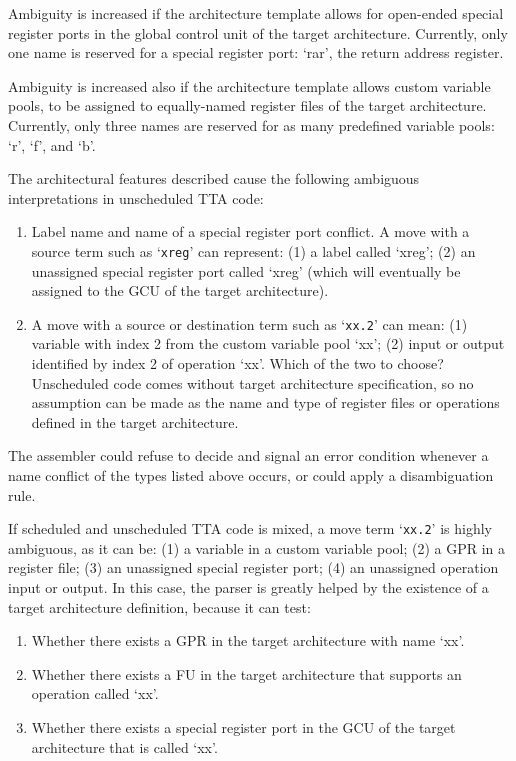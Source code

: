 \documentclass[twoside]{tce}
\begin{document}
Ambiguity is increased if the architecture template allows for open-ended
special register ports in the global control unit of the target
architecture. Currently, only one name is reserved for a special register
port: `rar', the return address register.

Ambiguity is increased also if the architecture template allows custom
variable pools, to be assigned to equally-named register files of the target
architecture. Currently, only three names are reserved for as many
predefined variable pools: `r', `f', and `b'.

The architectural features described cause the following ambiguous
interpretations in unscheduled TTA code:
\begin{enumerate}
\item %
  Label name and name of a special register port conflict. A move with a
  source term such as `\verb|xreg|' can represent: (1) a label called
  `xreg'; (2) an unassigned special register port called `xreg' (which will
  eventually be assigned to the GCU of the target architecture).
\item %
  A move with a source or destination term such as `\verb|xx.2|' can mean:
  (1) variable with index 2 from the custom variable pool `xx'; (2) input or
  output identified by index 2 of operation `xx'. Which of the two to
  choose? Unscheduled code comes without target architecture specification,
  so no assumption can be made as the name and type of register files or
  operations defined in the target architecture.
\end{enumerate}

The assembler could refuse to decide and signal an error condition whenever
a name conflict of the types listed above occurs, or could apply a
disambiguation rule.

If scheduled and unscheduled TTA code is mixed, a move term `\verb|xx.2|' is
highly ambiguous, as it can be: (1) a variable in a custom variable pool; (2)
a GPR in a register file; (3) an unassigned special register port; (4) an
unassigned operation input or output.
%
In this case, the parser is greatly helped by the existence of a target
architecture definition, because it can test:
\begin{enumerate}
\item %
  Whether there exists a GPR in the target architecture with name `xx'.
\item %
  Whether there exists a FU in the target architecture that supports an
  operation called `xx'.
\item %
  Whether there exists a special register port in the GCU of the target
  architecture that is called `xx'.
\end{enumerate}
\end{document}
